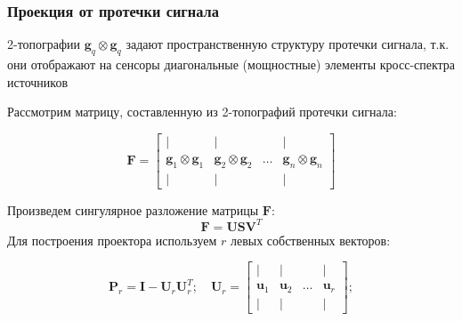 \documentclass[12pt]{beamer}
\begin{document}
\begin{frame}[t]
    \frametitle{Проекция от протечки сигнала}
    
{\tiny 2-топографии $\mathbf{g}_q\otimes \mathbf{g}_q$ задают пространственную структуру протечки сигнала,
т.к. они отображают на сенсоры диагональные (мощностные) элементы кросс-спектра источников}

    {\tiny Рассмотрим матрицу, составленную из 2-топографий протечки сигнала:}

    \begin{equation}
        \scriptstyle
        \mathbf{F} =
        \begin{bmatrix}
            |                                 & |                                 &       & |                                 \\
            \mathbf{g}_1 \otimes \mathbf{g}_1 & \mathbf{g}_2 \otimes \mathbf{g}_2 & \dots & \mathbf{g}_n \otimes \mathbf{g}_n \\
            |                                 & |                                 &       & |
        \end{bmatrix}
    \end{equation}

    {\tiny Произведем сингулярное разложение матрицы $\mathbf{F}$}:
\begin{equation}
    \scriptstyle
    \mathbf{F} = \mathbf{USV}^T
\end{equation}
    {\tiny Для построения проектора используем $r$ левых собственных векторов:}

\begin{equation}
    \scriptstyle
    \mathbf{P}_r = \mathbf{I} - \mathbf{U}_r \mathbf{U}_r^T\label{eq:P_fixed_or};\quad
    \mathbf{U}_r =
    \begin{bmatrix}
        |            & |            &        & |       \\
        \mathbf{u}_1 & \mathbf{u}_2 & \dots  & \mathbf{u}_r \\
        |            & |            &        & |
    \end{bmatrix}\label{eq:U_fixed_or};
 \end{equation}
\end{frame}
\end{document}
